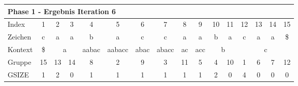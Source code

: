 \begin{table}[H]
\centering
\begin{adjustbox}{max width=\textwidth}
\begin{tabular}{lccccccccccccccc}
\multicolumn{16}{l}{Phase 1 - Ergebnis Iteration 6}                                                                                                                                                                                                                                                                                                                                                                          \\ \hline
\multicolumn{1}{l|}{Index}   & 1                       & 2                         & 3                       & 4                                                  & 5                           & \cellcolor[HTML]{\green}6 & 7                          & 8                         & 9                         & 10 & 11                      & 12 & 13                        & 14                        & 15  \\
\multicolumn{1}{l|}{Zeichen} & c                       & a                         & a                       & b                                                  & a                           & c                         & c                          & a                         & a                         & b  & a                       & c  & a                         & a                         & \$  \\ \cline{1-16}
\multicolumn{1}{l|}{Kontext} & \multicolumn{1}{c|}{\$} & \multicolumn{2}{c|}{a}                              & \multicolumn{1}{c|}{\cellcolor[HTML]{\red}aabac} & \multicolumn{1}{c|}{aabacc} & \multicolumn{1}{c|}{abac} & \multicolumn{1}{c|}{abacc} & \multicolumn{1}{c|}{ac}   & \multicolumn{1}{c|}{acc}  & \multicolumn{2}{c|}{b}       & \multicolumn{4}{c}{c}                                            \\
\multicolumn{1}{l|}{Gruppe}      & \multicolumn{1}{c|}{15} & 13                        & \multicolumn{1}{c|}{14} & \multicolumn{1}{c|}{\cellcolor[HTML]{\red}8}     & \multicolumn{1}{c|}{2}      & \multicolumn{1}{c|}{9}    & \multicolumn{1}{c|}{3}     & \multicolumn{1}{c|}{11}   & \multicolumn{1}{c|}{5}    & 4  & \multicolumn{1}{c|}{10} & 1  & 6                         & 7                         & 12  \\
\multicolumn{1}{l|}{GSIZE}   & \multicolumn{1}{c|}{1}  & \cellcolor[HTML]{\red}2 & \multicolumn{1}{c|}{0}  & \multicolumn{1}{c|}{\cellcolor[HTML]{\red}1}     & \multicolumn{1}{c|}{1}      & \multicolumn{1}{c|}{1}    & \multicolumn{1}{c|}{1}     & \multicolumn{1}{c|}{1}    & \multicolumn{1}{c|}{1}    & 2  & \multicolumn{1}{c|}{0}  & 4  & 0                         & 0                         & 0   \\

\end{tabular}
\end{adjustbox}
\end{table}
